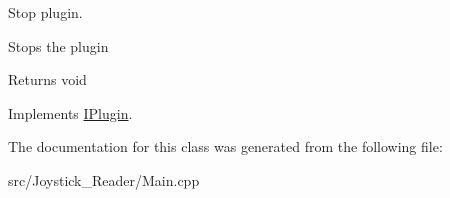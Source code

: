 Stop plugin. 

Stops the plugin \begin{DoxyReturn}{Returns}
void 
\end{DoxyReturn}


Implements \hyperlink{class_i_plugin_a86e523c283aec5c9fb21249a76e916ac}{I\+Plugin}.



The documentation for this class was generated from the following file\+:\begin{DoxyCompactItemize}
\item 
src/\+Joystick\+\_\+\+Reader/Main.\+cpp\end{DoxyCompactItemize}
